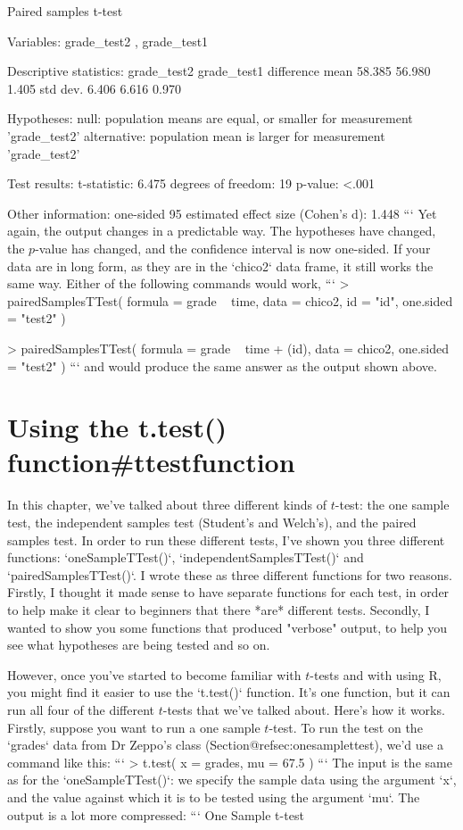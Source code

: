    Paired samples t-test 

Variables:  grade_test2 , grade_test1 

Descriptive statistics: 
            grade_test2 grade_test1 difference
   mean          58.385      56.980      1.405
   std dev.       6.406       6.616      0.970

Hypotheses: 
   null:        population means are equal, or smaller for measurement 'grade_test2' 
   alternative: population mean is larger for measurement 'grade_test2' 

Test results: 
   t-statistic:  6.475 
   degrees of freedom:  19 
   p-value:  <.001 

Other information: 
   one-sided 95%
   estimated effect size (Cohen's d):  1.448 
```
Yet again, the output changes in a predictable way. The hypotheses have changed, the $p$-value has changed, and the confidence interval is now one-sided. If your data are in long form, as they are in the `chico2` data frame, it still works the same way. Either of the following commands would work,
```
> pairedSamplesTTest( 
    formula = grade ~ time, 
    data = chico2, 
    id = "id", 
    one.sided = "test2" 
  )

> pairedSamplesTTest( 
    formula = grade ~ time + (id), 
    data = chico2, 
    one.sided = "test2" 
  )
```
and would produce the same answer as the output shown above.


\section{Using the t.test() function{#ttestfunction}}

In this chapter, we've talked about three different kinds of $t$-test: the one sample test, the independent samples test (Student's and Welch's), and the paired samples test. In order to run these different tests, I've shown you three different functions: `oneSampleTTest()`, `independentSamplesTTest()` and `pairedSamplesTTest()`. I wrote these as three different functions for two reasons. Firstly, I thought it made sense to have separate functions for each test, in order to help make it clear to beginners that there *are* different tests. Secondly, I wanted to show you some functions that produced "verbose" output, to help you see what hypotheses are being tested and so on. 

However, once you've started to become familiar with $t$-tests and with using R, you might find it easier to use the `t.test()` function. It's one function, but it can run all four of the different $t$-tests that we've talked about. Here's how it works.  Firstly, suppose you want to run a one sample $t$-test. To run the test on the `grades` data from Dr Zeppo's class (Section@refsec:onesamplettest), we'd use a command like this:
```
> t.test( x = grades, mu = 67.5 )
```
The input is the same as for the `oneSampleTTest()`: we specify the sample data using the argument `x`, and the value against which it is to be tested using the argument `mu`. The output is a lot more compressed:
```
	One Sample t-test

